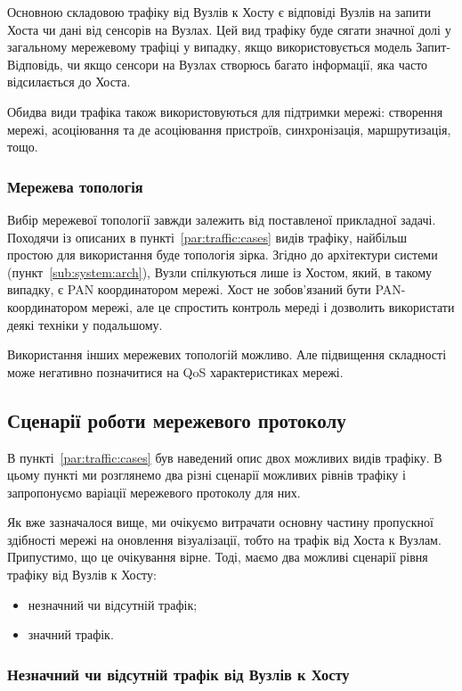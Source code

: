 \documentclass[a4paper,ukrainian,utf8,nocolumnsxix,floatsection,equationsection]{eskdtext}
\renewcommand\paragraph{\subsubsection}
\begin{document}
Основною складовою трафіку від Вузлів к Хосту є відповіді Вузлів на запити Хоста чи дані від сенсорів на Вузлах. Цей вид трафіку буде сягати значної долі у загальному мережевому трафіці у випадку, якщо використовується модель Запит-Відповідь, чи якщо сенсори на Вузлах створюсь багато інформації, яка часто відсилається до Хоста.

Обидва види трафіка також використовуються для підтримки мережі: створення мережі, асоціювання та де асоціювання пристроїв, синхронізація, маршрутизація, тощо.

\paragraph{Мережева топологія}

Вибір мережевої топології завжди залежить від поставленої прикладної задачі. Походячи із описаних в пункті~\ref{par:traffic:cases} видів трафіку, найбільш простою для використання буде топологія зірка. Згідно до архітектури системи (пункт~\ref{sub:system:arch}), Вузли спілкуються лише із Хостом, який, в такому випадку, є PAN координатором мережі. Хост не зобов’язаний бути PAN-координатором мережі, але це спростить контроль мереді і дозволить використати деякі техніки у подальшому.

Використання інших мережевих топологій можливо. Але підвищення складності може негативно позначитися на QoS характеристиках мережі.

\subsection{Сценарії роботи мережевого протоколу}
\label{sub:network:protocol:scenarios}

В пункті~\ref{par:traffic:cases} був наведений опис двох можливих видів трафіку. В цьому пункті ми розглянемо два різні сценарії можливих рівнів трафіку і запропонуємо варіації мережевого протоколу для них.

Як вже зазначалося вище, ми очікуємо витрачати основну частину пропускної здібності мережі на оновлення візуалізації, тобто на трафік від Хоста к Вузлам. Припустимо, що це очікування вірне. Тоді, маємо два можливі сценарії рівня трафіку від Вузлів к Хосту:
\begin{itemize}
	\item незначний чи відсутній трафік;
	\item значний трафік.
\end{itemize}


\paragraph{Незначний чи відсутній трафік від Вузлів к Хосту}
\label{par:low:ntht}
\end{document}
